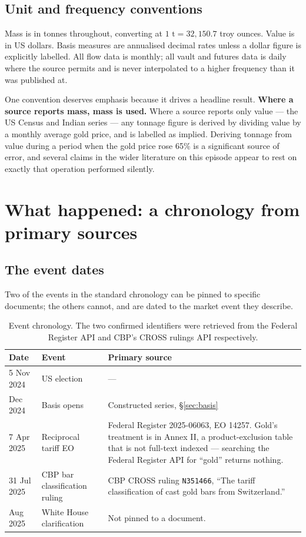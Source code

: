 \documentclass[11pt,a4paper]{article}
\begin{document}
\subsection{Unit and frequency conventions}

Mass is in tonnes throughout, converting at $1\text{ t} = 32{,}150.7$ troy ounces. Value is in
US dollars. Basis measures are annualised decimal rates unless a dollar figure is explicitly
labelled. All flow data is monthly; all vault and futures data is daily where the source
permits and is never interpolated to a higher frequency than it was published at.

One convention deserves emphasis because it drives a headline result. \textbf{Where a source
reports mass, mass is used.} Where a source reports only value --- the US Census and Indian
series --- any tonnage figure is derived by dividing value by a monthly average gold price, and
is labelled as implied. Deriving tonnage from value during a period when the gold price rose
65\% is a significant source of error, and several claims in the wider literature on this
episode appear to rest on exactly that operation performed silently.

\section{What happened: a chronology from primary sources}

\subsection{The event dates}

Two of the events in the standard chronology can be pinned to specific documents; the others
cannot, and are dated to the market event they describe.

\begin{table}[h]
\centering
\begin{tabular}{@{}llp{7.2cm}@{}}
\toprule
\textbf{Date} & \textbf{Event} & \textbf{Primary source} \\
\midrule
5 Nov 2024 & US election & --- \\
Dec 2024 & Basis opens & Constructed series, \S\ref{sec:basis} \\
7 Apr 2025 & Reciprocal tariff EO & Federal Register 2025-06063, EO 14257. Gold's treatment is
in Annex II, a product-exclusion table that is not full-text indexed --- searching the Federal
Register API for ``gold'' returns nothing. \\
31 Jul 2025 & CBP bar classification ruling & CBP CROSS ruling \texttt{N351466}, ``The tariff
classification of cast gold bars from Switzerland.'' \\
Aug 2025 & White House clarification & Not pinned to a document. \\
\bottomrule
\end{tabular}
\caption{Event chronology. The two confirmed identifiers were retrieved from the Federal
Register API and CBP's CROSS rulings API respectively.}
\end{table}
\end{document}
